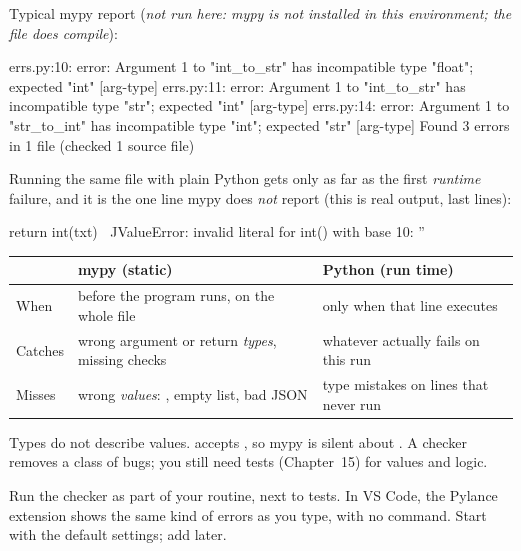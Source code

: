 Typical mypy report (\emph{not run here: mypy is not installed in this environment; the file does compile}):

\begin{rawcode}
errs.py:10: error: Argument 1 to "int_to_str" has incompatible type "float"; expected "int"  [arg-type]
errs.py:11: error: Argument 1 to "int_to_str" has incompatible type "str"; expected "int"  [arg-type]
errs.py:14: error: Argument 1 to "str_to_int" has incompatible type "int"; expected "str"  [arg-type]
Found 3 errors in 1 file (checked 1 source file)
\end{rawcode}

Running the same file with plain Python gets only as far as the first \emph{runtime} failure, and it is the one line
mypy does \emph{not} report (this is real output, last lines):

\begin{rawcode}
    return int(txt)
           ^^^^^^^^
ValueError: invalid literal for int() with base 10: ''
\end{rawcode}

\begin{center}
\begin{tabularx}{\linewidth}{@{}l >{\raggedright\arraybackslash}X >{\raggedright\arraybackslash}X@{}}
\toprule
 & \textbf{mypy (static)} & \textbf{Python (run time)} \\
\midrule
When & before the program runs, on the whole file & only when that line executes \\
Catches & wrong argument or return \emph{types}, missing \code{None} checks & whatever actually fails on this run \\
Misses & wrong \emph{values}: \code{int("")}, empty list, bad JSON & type mistakes on lines that never run \\
\bottomrule
\end{tabularx}
\end{center}

\begin{trap}
Types do not describe values.  accepts , so mypy is silent about . A checker
removes a class of bugs; you still need tests (Chapter~15) for values and logic.
\end{trap}

\begin{gamerule}
Run the checker as part of your routine, next to tests. In VS Code, the Pylance extension shows
the same kind of errors as you type, with no command. Start with the default settings; add  later.
\end{gamerule}


